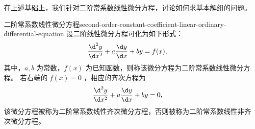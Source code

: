 在上述基础上，我们针对二阶常系数线性微分方程，讨论如何求基本解组的问题。
\begin{definition}{二阶常系数线性微分方程}{second-order-constant-coefficient-linear-ordinary-differential-equation}
    设二阶线性微分方程可化为如下形式：
    \begin{equation}
        \frac{\d^2 y}{\d x^2} + a \frac{\d y}{\d x} + b y = f(x) \label{eq:second-order-constant-coefficient-linear-ordinary-differential-equation},
    \end{equation}
    其中，$ a , b $ 为常数，$ f(x) $ 为已知函数，则称该微分方程为二阶常系数线性微分方程。
    若右端的 $ f(x) = 0 $ ，相应的齐次方程为
    \begin{equation}
        \frac{\d^2 y}{\d x^2} + a \frac{\d y}{\d x} + b y = 0 \label{eq:homogeneous-second-order-constant-coefficient-linear-ordinary-differential-equation},
    \end{equation}
    该微分方程被称为二阶常系数线性齐次微分方程，否则被称为二阶常系数线性非齐次微分方程。
\end{definition}

